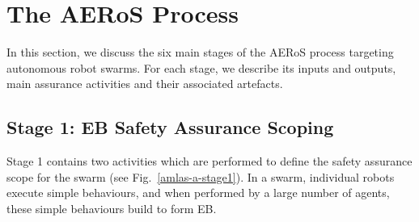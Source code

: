 \documentclass[runningheads]{llncs}
\begin{document}
\section{The AERoS Process}\label{framework}
In this section, we discuss the six main stages of the AERoS process targeting autonomous robot swarms. For each stage, we describe its inputs and outputs, main assurance activities and their associated artefacts.
%

\subsection{Stage 1: EB Safety Assurance Scoping} \label{framework-stage1}
Stage 1 contains two activities which are performed to define the safety assurance scope for the swarm (see Fig.~\ref{amlas-a-stage1}). In a swarm, individual robots execute simple behaviours, and when performed by a large number of agents, these simple behaviours build to form EB.
\end{document}
